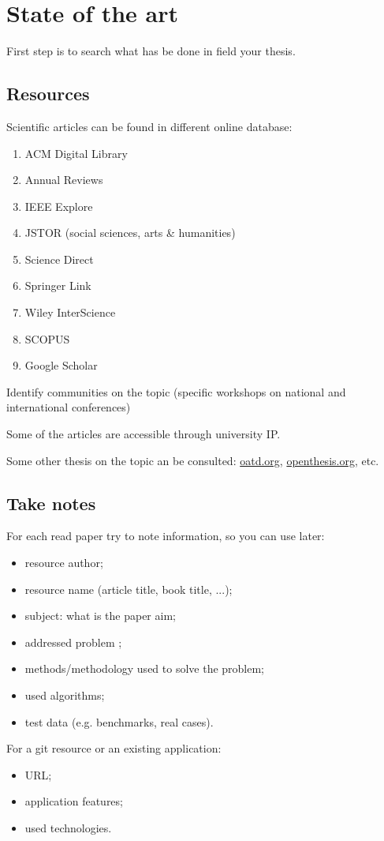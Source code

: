 
\chapter{State of the art}\label{chapter:chap2}

First step is  to search what has be done in field your thesis.

\section{Resources}

Scientific articles can be found in different online database:
\begin{enumerate}
    \item ACM Digital Library
    \item Annual Reviews
    \item IEEE Explore
    \item JSTOR (social sciences, arts \& humanities)
    \item Science Direct
    \item Springer Link
    \item Wiley InterScience
    \item SCOPUS
    \item  Google Scholar
\end{enumerate}

Identify communities on the topic (specific workshops on national and international conferences)

Some of the articles are accessible through university IP.

Some other thesis on the topic an be consulted: \url{oatd.org}, \url{openthesis.org}, etc.

\section{Take notes}

For each read paper try to note information, so you can use later:
\begin{itemize}
    \item resource author;
    \item resource name (article title, book title, ...);
    \item subject: what is the paper aim;
    \item addressed problem ; 
    \item methods/methodology used to solve the problem;
    \item used algorithms;
    \item test data (e.g. benchmarks, real cases).
\end{itemize}

For a git resource or an existing application:
\begin{itemize}
    \item URL;
    \item application features;
    \item used technologies.
\end{itemize}